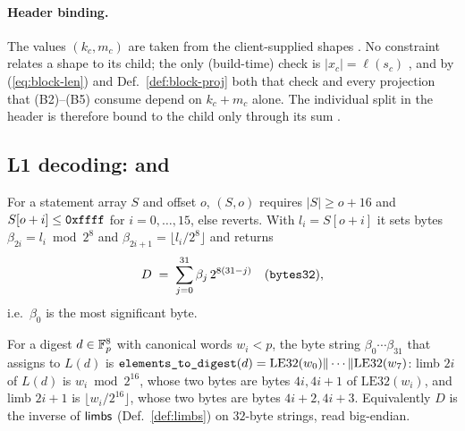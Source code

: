 \paragraph{Header binding.}
The values $(k_c,m_c)$ are taken from the client-supplied shapes
. No constraint relates a shape to its child; the
only (build-time) check is $|x_c|=\ell(s_c)$ , and by
(\ref{eq:block-len}) and Def.~\ref{def:block-proj} both that check and every
projection that (B2)--(B5) consume depend on $k_c+m_c$ alone. The individual split in
the header is therefore bound to the child only through its sum
.

\subsection{L1 decoding:  and }
\label{subsec:block-l1}

\begin{definition}
\label{def:digest-from-limbs}
For a statement array $S$ and offset $o$, $(S,o)$ requires
$|S| \ge o+16$ and $S[o+i] \le \texttt{0xffff}$ for $i=0,\dots,15$, else reverts.
With $l_i = S[o+i]$ it sets bytes
$\beta_{2i} = l_i \bmod 2^8$ and $\beta_{2i+1} = \lfloor l_i/2^8 \rfloor$ and returns
\[
  D \;=\; \sum_{j=0}^{31} \beta_j \, 2^{8(31-j)} \quad(\texttt{bytes32}),
\]
i.e.\ $\beta_0$ is the most significant byte.
\end{definition}

\begin{property}
For a digest $d\in\mathbb{F}_p^8$ with canonical words $w_i<p$, the byte string
$\beta_0\cdots\beta_{31}$ that  assigns to $L(d)$ is
$\texttt{elements\_to\_digest}(d)=\mathrm{LE32}(w_0)\|\cdots\|\mathrm{LE32}(w_7)$:
limb $2i$ of $L(d)$ is $w_i \bmod 2^{16}$, whose two bytes are bytes $4i,4i+1$ of
$\mathrm{LE32}(w_i)$, and limb $2i+1$ is $\lfloor w_i/2^{16}\rfloor$, whose two
bytes are bytes $4i+2,4i+3$. Equivalently $D$ is the inverse of $\mathsf{limbs}$
(Def.~\ref{def:limbs}) on $32$-byte strings, read big-endian.
\end{property}

